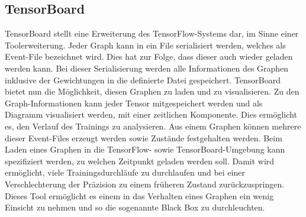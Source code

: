 \subsection{TensorBoard}

TensorBoard stellt eine Erweiterung des TensorFlow-Systems dar, im Sinne einer Toolerweiterung. 
Jeder Graph kann in ein File serialisiert werden, welches als Event-File bezeichnet wird. 
Dies hat zur Folge, dass dieser auch wieder geladen werden kann. 
Bei dieser Serialisierung werden alle Informationen des Graphen inklusive der Gewichtungen in die definierte Datei gespeichert.
TensorBoard bietet nun die Möglichkeit, diesen Graphen zu laden und zu visualisieren. 
Zu den Graph-Informationen kann jeder Tensor mitgespeichert werden und als Diagramm visualisiert werden, mit einer zeitlichen Komponente. 
Dies ermöglicht es, den Verlauf des Trainings zu analysieren. 
Aus einem Graphen können mehrere dieser Event-Files erzeugt werden sowie Zustände festgehalten werden. 
Beim Laden eines Graphen in die TensorFlow- sowie TensorBoard-Umgebung kann spezifiziert werden, zu welchen Zeitpunkt geladen werden soll. 
Damit wird ermöglicht, viele Trainingsdurchläufe zu durchlaufen und bei einer Verschlechterung der Präzision zu einem früheren Zustand zurückzuspringen.
Dieses Tool ermöglicht es einem in das Verhalten eines Graphen ein wenig Einsicht zu nehmen und so die sogenannte Black Box zu durchleuchten. 

